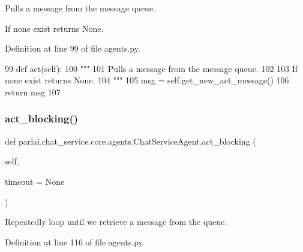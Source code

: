 \begin{DoxyVerb}Pulls a message from the message queue.

If none exist returns None.
\end{DoxyVerb}
 

Definition at line 99 of file agents.\+py.


\begin{DoxyCode}
99     \textcolor{keyword}{def }act(self):
100         \textcolor{stringliteral}{"""}
101 \textcolor{stringliteral}{        Pulls a message from the message queue.}
102 \textcolor{stringliteral}{}
103 \textcolor{stringliteral}{        If none exist returns None.}
104 \textcolor{stringliteral}{        """}
105         msg = self.get\_new\_act\_message()
106         \textcolor{keywordflow}{return} msg
107 
\end{DoxyCode}
\mbox{\label{classparlai_1_1chat__service_1_1core_1_1agents_1_1ChatServiceAgent_a386384cd487b710309328904ae79749d}} 
\subsubsection{\texorpdfstring{act\+\_\+blocking()}{act\_blocking()}}
{\footnotesize\ttfamily def parlai.\+chat\+\_\+service.\+core.\+agents.\+Chat\+Service\+Agent.\+act\+\_\+blocking (\begin{DoxyParamCaption}\item[{}]{self,  }\item[{}]{timeout = {\ttfamily None} }\end{DoxyParamCaption})}

\begin{DoxyVerb}Repeatedly loop until we retrieve a message from the queue.
\end{DoxyVerb}
 

Definition at line 116 of file agents.\+py.


